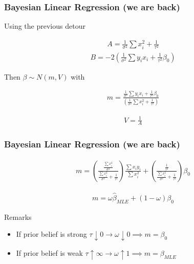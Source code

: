 \documentclass[
  shownotes,
  xcolor={svgnames},
  hyperref={colorlinks,citecolor=DarkBlue,linkcolor=DarkRed,urlcolor=DarkBlue}
  , aspectratio=169]{beamer}
\begin{document}
\begin{frame}[fragile]
\frametitle{Bayesian Linear Regression (we are back)}

Using the previous detour

\begin{align}
A= \frac{1}{\sigma^2}\sum x_i^2 +\frac{1}{\tau^2}
\end{align}
\medskip
\begin{align}
B= -2 \left(\frac{1}{\sigma^2}\sum y_i x_i +\frac{1}{\tau^2} \beta_0\right)
\end{align}

Then $\beta\sim N(m,V)$ with

\begin{align}
m=\frac{\frac{1}{\sigma^2}\sum y_i x_i +\frac{1}{\tau^2} \beta_0}{(\frac{1}{\sigma^2}\sum x_i^2 +\frac{1}{\tau^2})}
\end{align}

\begin{align}
 V=\frac{1}{A}
\end{align}


\end{frame}

\begin{frame}[fragile]
\frametitle{Bayesian Linear Regression (we are back)}

\begin{align}
m=\left(\frac{\frac{\sum x_i^2}{\sigma^2}}{\frac{\sum x_i^2}{\sigma^2}+\frac{1}{\tau^2}}\right)\frac{\sum x_iy_i}{\sum x_i^2} + \left(\frac{\frac{1}{\tau^2}}{\frac{\sum x_i^2}{\sigma^2}+\frac{1}{\tau^2}}\right)\beta_0
\end{align}

\medskip

\begin{align}
m = \omega \hat \beta_{MLE} + (1-\omega) \beta_0
\end{align}

Remarks 

\begin{itemize}
  \item If prior belief is strong $\tau \downarrow 0 \rightarrow \omega \downarrow 0 \implies m=\beta_0$ 
  \item If prior belief is weak $\tau \uparrow \infty \rightarrow \omega \uparrow 1 \implies m=\beta_{MLE}$ 

\end{itemize}

\end{frame}
\end{document}
